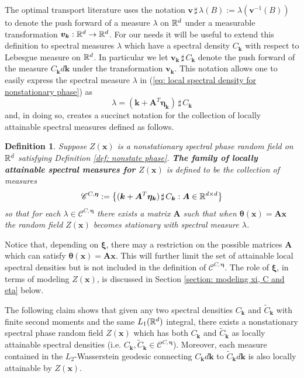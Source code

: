 \documentclass[10pt,noinfoline]{imsart}
\newtheorem{definition}{Definition}
\newcommand{\bs}{\boldsymbol}
\begin{document}
The optimal transport literature uses the notation $\bs v \,\sharp\, \lambda(B) := \lambda(\bs v^{-1}(B))$ to denote the push forward of a measure $\lambda$ on $\Bbb R^d$ under a measurable transformation $\bs v_{\bs k}:\Bbb R^d\rightarrow \Bbb R^d$. For our needs it will be useful to extend this definition to spectral measures $\lambda$ which have a spectral density $C_{\bs k}$  with respect to Lebesgue measure on $\Bbb R^d$.  In particular we let $\bs v_{\bs k}\,\sharp\, C_{\bs k}$ denote the push forward of the measure  $C_{\bs k}d\bs k$ under the transformation $\bs v_{\bs k}$. This notation allows one to easily express the spectral measure $\lambda$  in (\ref{eq: local spectral density for nonstationary phase}) as 
\[
\lambda= (\bs k+ \bs A^T \bs\eta_{\bs k})\,\sharp\, C_{\bs k}
\]
and, in doing so, creates a succinct notation for the collection of locally attainable spectral measures defined  as follows.


\begin{definition}
Suppose $Z(\bs x)$ is a nonstationary spectral phase random field on $\Bbb R^d$ satisfying Definition \ref{def: nonstate phase}. \textit{\textbf{The family of locally attainable spectral measures for $Z(\bs x)$}} is defined to be the collection of measures
\[
\mathscr C^{C,\bs\eta}:= \big\{ (\bs k+ \bs A^T \bs\eta_{\bs k})\,\sharp\, C_{\bs k}: \bs A \in \Bbb R^{d\times d}\big\}
\] 
so that for each $\lambda \in \mathscr C^{C,\bs\eta}$ there exists a matrix $\bs A$ such that when $\bs \theta(\bs x) = \bs A\bs x$ the random field $Z(\bs x)$ becomes stationary with spectral measure $\lambda$.
\end{definition}


Notice that, depending on $\bs \xi$, there may a restriction on the possible matrices $\bs A$ which can satisfy $\bs \theta(\bs x) = \bs A\bs x$. This will further limit the set of attainable local spectral densities but is not included in the definition of $\mathscr C^{C,\bs \eta}$. The role of $\bs \xi$, in terms of modeling $Z(\bs x)$, is discussed in Section \ref{section: modeling xi, C and eta} below.


The following claim shows that given any two spectral densities $C_{\bs k}$ and $\tilde C_{\bs k}$ with finite second moments and the same $L_1(\Bbb R^d)$ integral, there exists a nonstationary spectral phase random field $
Z(\bs x)$ which has both $C_{\bs k}$ and $\tilde C_{\bs k}$ as locally attainable spectral densities (i.e. $C_{\bs k},\tilde C_{\bs k}\in\mathscr C^{C,\bs \eta}$). Moreover, each measure contained in the $L_2$-Wasserstein geodesic connecting $C_{\bs k}d\bs k$ to $\tilde C_{\bs k}d\bs k$ is also locally attainable by $Z(\bs x)$.
\end{document}
